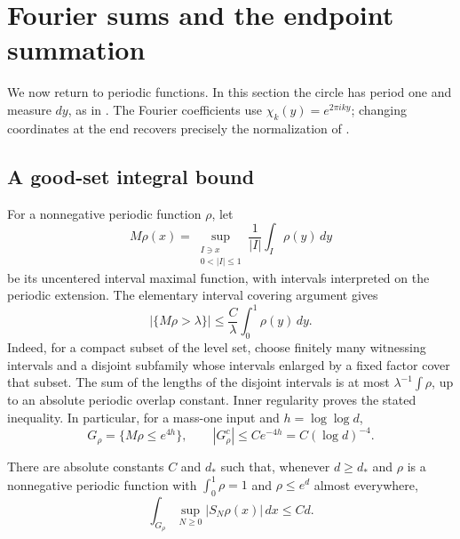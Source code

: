 \section{Fourier sums and the endpoint summation}\label{sec:fourier}

We now return to periodic functions. In this section the circle has
period one and measure $dy$, as in . The Fourier
coefficients use $\chi_k(y)=e^{2\pi iky}$; changing coordinates at the end
recovers precisely the normalization of .

\subsection{A good-set integral bound}

For a nonnegative periodic function $\rho$, let
\[
 M\rho(x)=\sup_{\substack{I\ni x\\0<|I|\le1}}
                   \frac1{|I|}\int_I\rho(y)\,dy
\]
be its uncentered interval maximal function, with intervals interpreted
on the periodic extension. The elementary interval covering argument
gives
\begin{equation}\label{eq:fourier-maximal-weak}
 \bigl|\{M\rho>\lambda\}\bigr|\le
                 \frac{C}{\lambda}\int_0^1\rho(y)\,dy.
\end{equation}
Indeed, for a compact subset of the level set, choose finitely many
witnessing intervals and a disjoint subfamily whose intervals enlarged
by a fixed factor cover that subset. The sum of the lengths of the
disjoint intervals is at most $\lambda^{-1}\int\rho$, up to an absolute
periodic overlap constant. Inner regularity proves the stated
inequality. In particular, for a mass-one input and $h=\log\log d$,
\[
 G_\rho=\{M\rho\le e^{4h}\},
 \qquad |G_\rho^c|\le Ce^{-4h}=C(\log d)^{-4}.
\]

\begin{theorem}\label{thm:good-set}
There are absolute constants $C$ and $d_*$ such that, whenever $d\ge d_*$
and $\rho$ is a nonnegative periodic function with
$\int_0^1\rho=1$ and $\rho\le e^d$ almost everywhere,
\begin{equation}\label{eq:source-18}
       \int_{G_\rho}\sup_{N\ge0}|S_N\rho(x)|\,dx\le Cd.
\end{equation}
\end{theorem}

